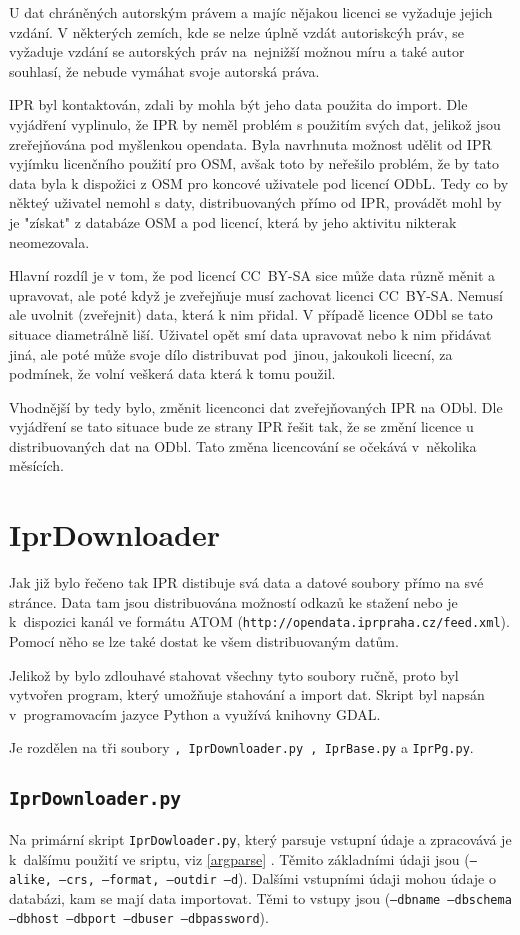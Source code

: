 U dat chráněných autorským právem a majíc nějakou licenci se vyžaduje jejich vzdání.
V některých zemích, kde se nelze úplně vzdát autoriskcýh práv, se vyžaduje vzdání se
autorských práv na~nejnižší možnou míru a také autor souhlasí, že nebude vymáhat
svoje autorská práva.
\cite{ODbl}

IPR byl kontaktován, zdali by mohla být jeho data použita do import.
Dle vyjádření vyplinulo, že IPR by neměl problém s použitím svých dat, jelikož
jsou zreřejňována pod myšlenkou opendata. Byla navrhnuta možnost udělit od IPR vyjímku
licenčního použití pro OSM, avšak toto by neřešilo problém, že by tato data byla
k dispožici z OSM pro koncové uživatele pod licencí ODbL.
Tedy co by někteý uživatel nemohl s daty, distribuovaných přímo od IPR, provádět mohl
by je "získat" z databáze OSM a pod licencí, která by jeho aktivitu nikterak neomezovala.

Hlavní rozdíl je v tom, že pod licencí CC~BY-SA sice může data různě měnit a upravovat,
ale poté když je zveřejňuje musí zachovat licenci CC~BY-SA. Nemusí ale uvolnit
(zveřejnit) data, která k nim přidal.
V případě licence ODbl se tato situace diametrálně liší. Uživatel opět smí data
upravovat nebo k nim přidávat jiná, ale poté může svoje dílo distribuvat
pod~jinou, jakoukoli licecní, za podmínek, že volní veškerá data která k tomu použil.

Vhodnější by tedy bylo, změnit licenconci dat zveřejňovaných IPR na ODbl.
Dle vyjádření se tato situace bude ze strany IPR řešit tak, že se změní 
licence u distribuovaných dat na ODbl. Tato změna licencování se očekává 
v~několika měsících.

\section{IprDownloader}
\label{Iprdownloader}
Jak již bylo řečeno tak IPR distibuje svá data a datové soubory přímo na své 
stránce. Data tam jsou distribuována možností odkazů ke stažení nebo je
k~dispozici kanál ve formátu ATOM ({\tt http://opendata.iprpraha.cz/feed.xml}).
Pomocí něho se lze také dostat ke všem distribuovaným datům.

Jelikož by bylo zdlouhavé stahovat všechny tyto soubory ručně, proto byl
vytvořen program, který umožňuje stahování a import dat. Skript byl napsán
v~programovacím jazyce Python a využívá knihovny GDAL.

Je rozdělen na tři soubory 
{\tt , IprDownloader.py , IprBase.py} a {\tt IprPg.py}.


\subsection{{\tt IprDownloader.py}}
Na primární skript {\tt IprDowloader.py}, který parsuje vstupní údaje a
zpracovává je k~dalšímu použití ve sriptu, viz \ref{argparse} .
Těmito základními údaji jsou
({\tt ---alike, ---crs, ---format, ---outdir ---d}). Dalšími vstupními údaji mohou
údaje o databázi, kam se mají data importovat. Těmi to vstupy jsou
({\tt ---dbname ---dbschema ---dbhost ---dbport ---dbuser ---dbpassword}).

